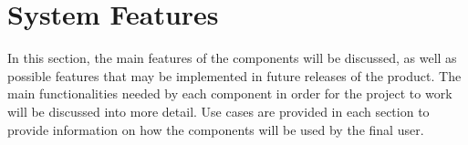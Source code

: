 \section{System Features}
\label{sec:system-features}

In this section, the main features of the components will be discussed, as well as possible features that may be implemented in future releases of the product.
The main functionalities needed by each component in order for the project to work will be discussed into more detail. \newline
Use cases are provided in each section to provide information on how the components will be used by the final user. 






